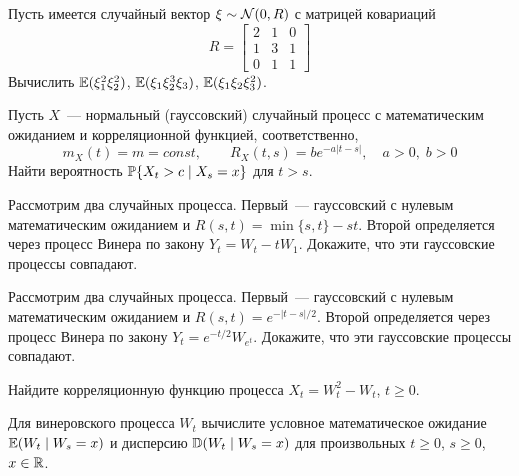 \documentclass[12pt]{article}
\def\canon{\textbf{(каноническое задание)}}
\begin{document}
\newpage




\begin{exercise}[subtitle={\canon}]
    Пусть имеется случайный вектор $ \xi \sim \mathcal{N}(0, R) $ с матрицей ковариаций
    \[
        R =
        \begin{bmatrix}
            2 & 1 & 0 \\
            1 & 3 & 1 \\
            0 & 1 & 1
        \end{bmatrix}
    \]
    Вычислить $ \operatorname{\mathbb{E}} (\xi_1^2 \xi_2^2) $, $ \operatorname{\mathbb{E}} (\xi_1 \xi_2^3 \xi_3) $, $ \operatorname{\mathbb{E}} (\xi_1 \xi_2 \xi_3^2) $.
\end{exercise}


\begin{exercise}[subtitle={\canon}]
    Пусть $ X $~--- нормальный (гауссовский) случайный процесс с математическим ожиданием и корреляционной функцией, соответственно,
    \[
        m_X(t) = m = const, \qquad
        R_X(t, s) = b e^{-a|t - s|}, \quad a > 0, \; b > 0
    \]
    Найти вероятность $ \mathbb{P} \{ X_t > c \mid X_s = x \} $ для $ t > s $.
\end{exercise}


\begin{exercise}[subtitle={(\textit{<<броуновский мост>>})}]
    Рассмотрим два случайных процесса.
    Первый~--- гауссовский с нулевым математическим ожиданием и $ R(s, t) = \min\{ s, t \} - st $.
    Второй определяется через процесс Винера по закону $ Y_t = W_t - t W_1 $.
    Докажите, что эти гауссовские процессы совпадают.
\end{exercise}


\begin{exercise}[subtitle={(\textit{процесс Орнштейна-Уленбека})}]
    Рассмотрим два случайных процесса.
    Первый~--- гауссовский с нулевым математическим ожиданием и $ R(s, t) = e^{-|t-s|/2} $.
    Второй определяется через процесс Винера по закону $ Y_t = e^{-t/2} W_{e^t} $.
    Докажите, что эти гауссовские процессы совпадают.
\end{exercise}


\begin{exercise}
    Найдите корреляционную функцию процесса $ X_t = W_t^2 - W_t $, $ t \geqslant 0 $.
\end{exercise}


\begin{exercise}
    Для винеровского процесса $ W_t $ вычислите условное математическое ожидание $ \operatorname{\mathbb{E}} (W_t \mid W_s = x) $ и дисперсию $ \operatorname{\mathbb{D}} (W_t \mid W_s = x) $
    для произвольных $ t \geqslant 0 $, $ s \geqslant 0 $, $ x \in \mathbb{R} $.
\end{exercise}
\end{document}
